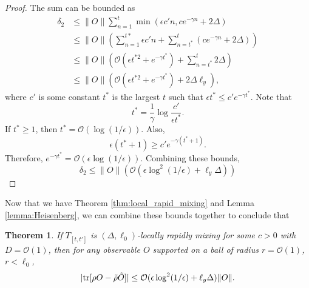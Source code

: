 \documentclass[prx,aps,amsmath,amssymb,floatfix,superscriptaddress,11pt,tightenlines,longbibliography,onecolumn,notitlepage]{revtex4-1}
\newcommand{\Tr}{\textnormal{tr}}
\newtheorem{thm}{Theorem}
\begin{document}
\begin{proof}
  The sum can be bounded as
  \begin{equation}
    \begin{aligned}
      \delta_2 &\leq \|O \| \sum_{n=1}^t \min(\epsilon c' n, ce^{-\gamma n} + 2\Delta) \\
      &\leq \|O \|( \sum_{n=1}^{t*} \epsilon c' n +\sum_{n=t^*}^{t} (ce^{-\gamma n} + 2\Delta)) \\
      &\leq \|O \| (\mathcal{O}(\epsilon t^{*2} + e^{-\gamma t^*}) + \sum_{n=t^*}^t 2\Delta )\\
      &\leq \|O \|(\mathcal{O}(\epsilon t^{*2} + e^{-\gamma t^*}) + 2\Delta \ell_y),
      \end{aligned}
    \end{equation}
    where $c'$ is some constant  $t^*$ is the largest $t$ such that $\epsilon t^* \leq c'e^{-\gamma t^*}$. Note that
    \begin{equation}
      t^* = \frac{1}{\gamma} \log \frac{c'}{\epsilon t^*}.
    \end{equation}
    If $t^*\geq 1$, then $t^*=\mathcal{O}(\log(1/\epsilon))$. Also,
    \begin{equation}
      \epsilon (t^*+1) \geq c' e^{-\gamma (t^*+1)}.
    \end{equation}
    Therefore, $e^{-\gamma t^*} = \mathcal{O}(\epsilon \log(1/\epsilon))$. Combining these bounds,
    \begin{equation}
      \delta_2 \leq \|O \|(\mathcal{O}(\epsilon \log^2(1/\epsilon) + \ell_y \Delta))
      \end{equation}
\end{proof}

Now that we have Theorem \ref{thm:local_rapid_mixing} and Lemma \ref{lemma:Heisenberg}, we can combine these bounds together to conclude that
\begin{thm}
  \label{thm:local_rapid_mixing_stability}
  If $T_{[t,t']}$ is $(\Delta,\ell_0)$-locally rapidly mixing for some $c>0$ with $D= \mathcal{O}(1)$, then for any observable $O$ supported on a ball of radius $r=\mathcal{O}(1)$, $r<\ell_0$,
  \begin{equation}
    |\Tr[\rho O - \tilde{\rho} \tilde{O}]|\leq \mathcal{O}(\epsilon \log^{2}(1/\epsilon) + \ell_y \Delta) \|O \|.
  \end{equation}
\end{thm}
\end{document}
